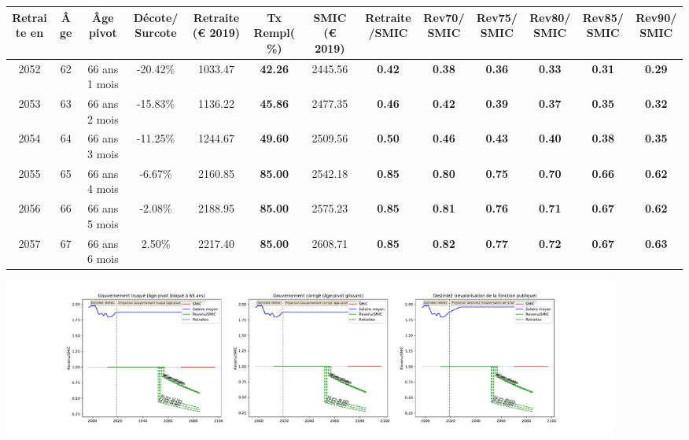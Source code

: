 { \scriptsize \begin{center} 
\begin{tabular}[htb]{|c|c||c|c||c|c||c||c|c|c|c|c|c|} 
\hline 
 Retraite en &  Âge &  Âge pivot &  Décote/Surcote &  Retraite (\euro{} 2019) &  Tx Rempl(\%) &  SMIC (\euro{} 2019) &  Retraite/SMIC &  Rev70/SMIC &  Rev75/SMIC &  Rev80/SMIC &  Rev85/SMIC &  Rev90/SMIC \\ 
\hline \hline 
 2052 &  62 &  66 ans 1 mois &  -20.42\% &  1033.47 &  {\bf 42.26} &  2445.56 &  {\bf {\color{red} 0.42}} &  {\bf {\color{red} 0.38}} &  {\bf {\color{red} 0.36}} &  {\bf {\color{red} 0.33}} &  {\bf {\color{red} 0.31}} &  {\bf {\color{red} 0.29}} \\ 
\hline 
 2053 &  63 &  66 ans 2 mois &  -15.83\% &  1136.22 &  {\bf 45.86} &  2477.35 &  {\bf {\color{red} 0.46}} &  {\bf {\color{red} 0.42}} &  {\bf {\color{red} 0.39}} &  {\bf {\color{red} 0.37}} &  {\bf {\color{red} 0.35}} &  {\bf {\color{red} 0.32}} \\ 
\hline 
 2054 &  64 &  66 ans 3 mois &  -11.25\% &  1244.67 &  {\bf 49.60} &  2509.56 &  {\bf {\color{red} 0.50}} &  {\bf {\color{red} 0.46}} &  {\bf {\color{red} 0.43}} &  {\bf {\color{red} 0.40}} &  {\bf {\color{red} 0.38}} &  {\bf {\color{red} 0.35}} \\ 
\hline 
 2055 &  65 &  66 ans 4 mois &  -6.67\% &  2160.85 &  {\bf 85.00} &  2542.18 &  {\bf {\color{red} 0.85}} &  {\bf {\color{red} 0.80}} &  {\bf {\color{red} 0.75}} &  {\bf {\color{red} 0.70}} &  {\bf {\color{red} 0.66}} &  {\bf {\color{red} 0.62}} \\ 
\hline 
 2056 &  66 &  66 ans 5 mois &  -2.08\% &  2188.95 &  {\bf 85.00} &  2575.23 &  {\bf {\color{red} 0.85}} &  {\bf {\color{red} 0.81}} &  {\bf {\color{red} 0.76}} &  {\bf {\color{red} 0.71}} &  {\bf {\color{red} 0.67}} &  {\bf {\color{red} 0.62}} \\ 
\hline 
 2057 &  67 &  66 ans 6 mois &  2.50\% &  2217.40 &  {\bf 85.00} &  2608.71 &  {\bf {\color{red} 0.85}} &  {\bf {\color{red} 0.82}} &  {\bf {\color{red} 0.77}} &  {\bf {\color{red} 0.72}} &  {\bf {\color{red} 0.67}} &  {\bf {\color{red} 0.63}} \\ 
\hline 
\hline 
\end{tabular} 
\end{center} } 

 \begin{center}\includegraphics[width=0.9\textwidth]{fig/SMIC_1990_22_dest_retraite.pdf}\end{center} \label{fig/SMIC_1990_22_dest_retraite.pdf} 

